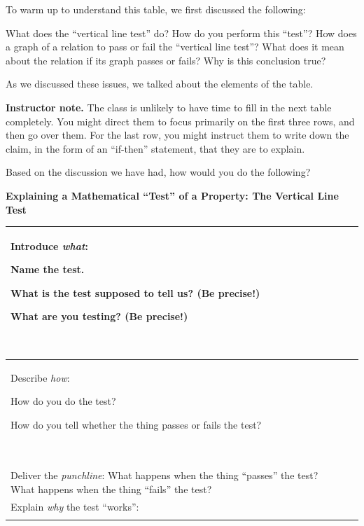 \documentclass[11pt]{article}
\newcommand\smallnote[1]
	{\begin{mdframed}\raggedright  {\bf Instructor note.} {#1} \end{mdframed}}
\newenvironment{task}
	{\begin{mdframed}[linecolor=lightgray, linewidth=3pt]\raggedright}
	{\end{mdframed}}
\theoremstyle{definition}
\begin{document}
To warm up to understand this table, we first discussed the following:

\vspace*{-4pt}
\begin{task}
What does the ``vertical line test'' do? How do you perform this ``test''? How does a graph of a relation to pass or fail the ``vertical line test''? What does it mean about the relation if its graph passes or fails? Why is this conclusion true?
\end{task}

As we discussed these issues, we talked about the elements of the table.


\smallnote{The class is unlikely to have time to fill in the next table completely. You might direct them to focus primarily on the first three rows, and then go over them. For the last row, you might instruct them to write down the claim, in the form of an ``if-then'' statement, that they are to explain.}

\begin{task}
Based on the discussion we have had, how would you do the following?

\begin{center}
{\bf Explaining a Mathematical ``Test'' of a Property: The Vertical Line Test}

\begin{tabular}{|L{4in}|L{1.5in}|}
\hline 
Introduce {\it what}:	
	\begin{itemize*}
	\item Name the test.
	\item What is the test supposed to tell us? (Be precise!) 
	\item What are you testing? (Be precise!) 
	\end{itemize*} \vspace*{-12pt}$\;$
	& 

	\\ \hline 
Describe {\it how}:
	\begin{itemize*}
	\item How do you do the test?
	\item How do you tell whether the thing passes or fails the test?
	\end{itemize*} \vspace*{-12pt}$\;$
	& 

	\\ \hline 
Deliver the {\it punchline}: What happens when the thing ``passes'' the test? What happens when the thing ``fails'' the test?
	& 

	 \\ \hline 
Explain {\it why} the test ``works'': 
	& \\ & 
	\\ \hline 
\end{tabular}
\end{center}
\end{task}
\end{document}

